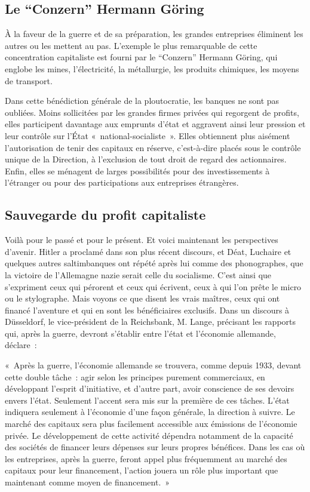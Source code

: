 \documentclass[french,twoside]{book} %
\newenvironment{quoteblock}%
  {\begin{quoting}}
  {\end{quoting}}
\newenvironment{quotebar}{%
    \def\FrameCommand{{\color{rubric!10!}\vrule width 0.5em} \hspace{0.9em}}%
    \def\OuterFrameSep{\itemsep} %
    \MakeFramed {\advance\hsize-\width \FrameRestore}
  }%
  {%
    \endMakeFramed
  }
\renewenvironment{quoteblock}%
  {%
    \savenotes
    \setstretch{0.9}
    \normalfont
    \begin{quotebar}
  }
  {%
    \end{quotebar}
    \spewnotes
  }
\begin{document}
\subsection[Le “Conzern” Hermann Göring]{Le “Conzern” Hermann Göring}
\noindent À la faveur de la guerre et de sa préparation, les grandes entreprises éliminent les autres ou les mettent au pas. L’exemple le plus remarquable de cette concentration capitaliste est fourni par le “Conzern” Hermann Göring, qui englobe les mines, l’électricité, la métallurgie, les produits chimiques, les moyens de transport.\par
Dans cette bénédiction générale de la ploutocratie, les banques ne sont pas oubliées. Moins sollicitées par les grandes firmes privées qui regorgent de profits, elles participent davantage aux emprunts d’état et aggravent ainsi leur pression et leur contrôle sur l’État « national-socialiste ». Elles obtiennent plus aisément l’autorisation de tenir des capitaux en réserve, c’est-à-dire placés sous le contrôle unique de la Direction, à l’exclusion de tout droit de regard des actionnaires. Enfin, elles se ménagent de larges possibilités pour des investissements à l’étranger ou pour des participations aux entreprises étrangères.
\subsection[Sauvegarde du profit capitaliste]{Sauvegarde du profit capitaliste}
\noindent Voilà pour le passé et pour le présent. Et voici maintenant les perspectives d’avenir. Hitler a proclamé dans son plus récent discours, et Déat, Luchaire et quelques autres saltimbanques ont répété après lui comme des phonographes, que la victoire de l’Allemagne nazie serait celle du socialisme. C’est ainsi que s’expriment ceux qui pérorent et ceux qui écrivent, ceux à qui l’on prête le micro ou le stylographe. Mais voyons ce que disent les vrais maîtres, ceux qui ont financé l’aventure et qui en sont les bénéficiaires exclusifs. Dans un discours à Düsseldorf, le vice-président de la Reichsbank, M. Lange, précisant les rapports qui, après la guerre, devront s’établir entre l’état et l’économie allemande, déclare :\par

\begin{quoteblock}
 \noindent « Après la guerre, l’économie allemande se trouvera, comme depuis 1933, devant cette double tâche : agir selon les principes purement commerciaux, en développant l’esprit d’initiative, et d’autre part, avoir conscience de ses devoirs envers l’état. Seulement l’accent sera mis sur la première de ces tâches. L’état indiquera seulement à l’économie d’une façon générale, la direction à suivre. Le marché des capitaux sera plus facilement accessible aux émissions de l’économie privée. Le développement de cette activité dépendra notamment de la capacité des sociétés de financer leurs dépenses sur leurs propres bénéfices. Dans les cas où les entreprises, après la guerre, feront appel plus fréquemment au marché des capitaux pour leur financement, l’action jouera un rôle plus important que maintenant comme moyen de financement. »
 \end{quoteblock}
\end{document}
